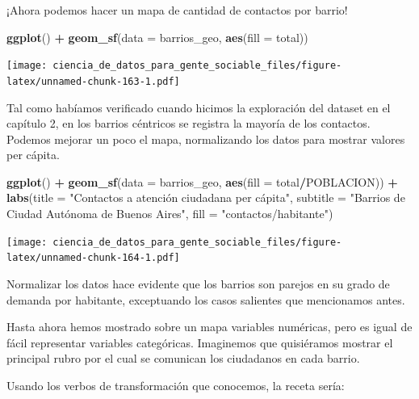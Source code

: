 \documentclass[]{book}
\newenvironment{Shaded}{\begin{snugshade}}{\end{snugshade}}
\newcommand{\KeywordTok}[1]{\textcolor[rgb]{0.13,0.29,0.53}{\textbf{#1}}}
\newcommand{\DataTypeTok}[1]{\textcolor[rgb]{0.13,0.29,0.53}{#1}}
\newcommand{\StringTok}[1]{\textcolor[rgb]{0.31,0.60,0.02}{#1}}
\newcommand{\OperatorTok}[1]{\textcolor[rgb]{0.81,0.36,0.00}{\textbf{#1}}}
\newcommand{\NormalTok}[1]{#1}
\begin{document}
¡Ahora podemos hacer un mapa de cantidad de contactos por barrio!

\begin{Shaded}
\begin{Highlighting}[]
\KeywordTok{ggplot}\NormalTok{() }\OperatorTok{+}\StringTok{ }\KeywordTok{geom_sf}\NormalTok{(}\DataTypeTok{data =}\NormalTok{ barrios_geo, }\KeywordTok{aes}\NormalTok{(}\DataTypeTok{fill =}\NormalTok{ total))}
\end{Highlighting}
\end{Shaded}

\texttt{[image: ciencia\_de\_datos\_para\_gente\_sociable\_files/figure-latex/unnamed-chunk-163-1.pdf]}

Tal como habíamos verificado cuando hicimos la exploración del dataset
en el capítulo 2, en los barrios céntricos se registra la mayoría de los
contactos. Podemos mejorar un poco el mapa, normalizando los datos para
mostrar valores per cápita.

\begin{Shaded}
\begin{Highlighting}[]
\KeywordTok{ggplot}\NormalTok{() }\OperatorTok{+}\StringTok{ }
\StringTok{    }\KeywordTok{geom_sf}\NormalTok{(}\DataTypeTok{data =}\NormalTok{ barrios_geo, }\KeywordTok{aes}\NormalTok{(}\DataTypeTok{fill =}\NormalTok{ total}\OperatorTok{/}\NormalTok{POBLACION)) }\OperatorTok{+}
\StringTok{    }\KeywordTok{labs}\NormalTok{(}\DataTypeTok{title =} \StringTok{"Contactos a atención ciudadana per cápita"}\NormalTok{,}
         \DataTypeTok{subtitle =} \StringTok{"Barrios de Ciudad Autónoma de Buenos Aires"}\NormalTok{,}
         \DataTypeTok{fill =} \StringTok{"contactos/habitante"}\NormalTok{)}
\end{Highlighting}
\end{Shaded}

\texttt{[image: ciencia\_de\_datos\_para\_gente\_sociable\_files/figure-latex/unnamed-chunk-164-1.pdf]}

Normalizar los datos hace evidente que los barrios son parejos en su
grado de demanda por habitante, exceptuando los casos salientes que
mencionamos antes.

Hasta ahora hemos mostrado sobre un mapa variables numéricas, pero es
igual de fácil representar variables categóricas. Imaginemos que
quisiéramos mostrar el principal rubro por el cual se comunican los
ciudadanos en cada barrio.

Usando los verbos de transformación que conocemos, la receta sería:
\end{document}
